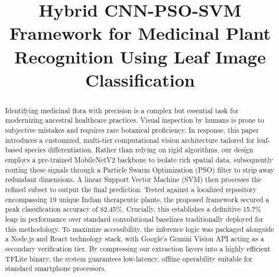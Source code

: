 \documentclass[conference]{IEEEtran}
\begin{document}
\title{Hybrid CNN-PSO-SVM Framework for Medicinal Plant\\
Recognition Using Leaf Image Classification}

\author{
}

\maketitle

\begin{abstract}
Identifying medicinal flora with precision is a complex but essential task for modernizing ancestral healthcare practices. Visual inspection by humans is prone to subjective mistakes and requires rare botanical proficiency. In response, this paper introduces a customized, multi-tier computational vision architecture tailored for leaf-based species differentiation. Rather than relying on rigid algorithms, our design employs a pre-trained MobileNetV2 backbone to isolate rich spatial data, subsequently routing these signals through a Particle Swarm Optimization (PSO) filter to strip away redundant dimensions. A linear Support Vector Machine (SVM) then processes the refined subset to output the final prediction. Tested against a localized repository encompassing 19 unique Indian therapeutic plants, the proposed framework secured a peak classification accuracy of 82.45\%. Crucially, this establishes a definitive 15.7\% leap in performance over standard convolutional baselines traditionally deployed for this methodology. To maximize accessibility, the inference logic was packaged alongside a Node.js and React technology stack, with Google's Gemini Vision API acting as a secondary verification tier. By compressing our extraction layers into a highly efficient TFLite binary, the system guarantees low-latency, offline operability suitable for standard smartphone processors.
\end{abstract}
\end{document}
